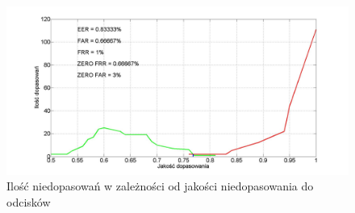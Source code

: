 \begin{figure}[!htb]
    \begin{center}
		\includegraphics[angle=0,scale=0.27]{img/simetric_distance_ob_line.jpg}
		\caption{Ilość niedopasowań w zależności od jakości niedopasowania do odcisków}
		\label{img:ob_simetric_line}
    \end{center}
\end{figure} 